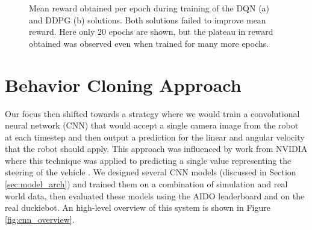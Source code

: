 \documentclass{article}
\begin{document}
\begin{figure}[H]
\centering
    \qquad
    \caption{Mean reward obtained per epoch during training of the DQN (a) and DDPG (b) solutions. Both solutions failed to improve mean reward. Here only 20 epochs are shown, but the plateau in reward obtained was observed even when trained for many more epochs.}
    \label{fig:rl_training}
\end{figure}

\section{Behavior Cloning Approach}

Our focus then shifted towards a strategy where we would train a convolutional neural network (CNN) that would accept a single camera image from the robot at each timestep and then output a prediction for the linear and angular velocity that the robot should apply. This approach was influenced by work from NVIDIA where this technique was applied to predicting a single value representing the steering of the vehicle \cite{DBLP:journals/corr/BojarskiTDFFGJM16}. We designed several CNN models (discussed in Section \ref{sec:model_arch}) and trained them on a combination of simulation and real world data, then evaluated these models using the AIDO leaderboard and on the real duckiebot. An high-level overview of this system is shown in Figure \ref{fig:cnn_overview}.
\end{document}
